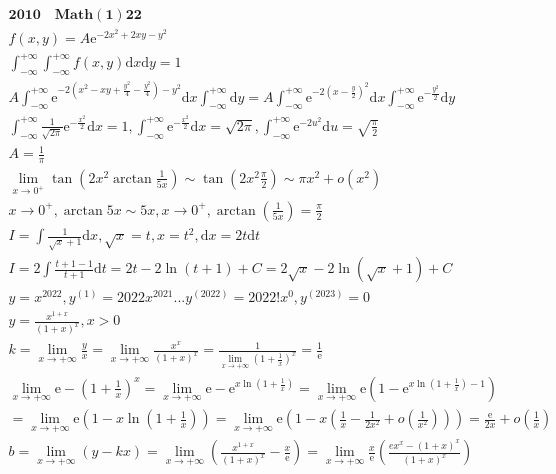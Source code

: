 \documentclass{article}
\begin{document}
\clearpage 
\begin{align*}
    \bm{2010 \quad Math(1)22 } \\
    f(x,y) = A \mathrm{e}^{-2x^2+2xy-y^2} \\
    \int_{-\infty}^{+\infty}\int_{-\infty}^{+\infty} f(x,y) \mathrm{d}x\mathrm{d}y = 1 \\ 
    A  \int_{-\infty}^{+\infty} \mathrm{e}^{-2(x^2-xy+\frac{y^2}{4}-\frac{y^2}{4})-y^2} \mathrm{d}x\int_{-\infty}^{+\infty}\mathrm{d}y=A\int_{-\infty}^{+\infty}\mathrm{e}^{-2(x-\frac{y}{2})^2}\mathrm{d}x\int_{-\infty}^{+\infty}\mathrm{e}^{-\frac{y^2}{2}}\mathrm{d}y \\
    \int_{-\infty}^{+\infty}\frac{1}{\sqrt{2\pi}}\mathrm{e}^{-\frac{x^2}{2}} \mathrm{d}x = 1 ,\int_{-\infty}^{+\infty}\mathrm{e}^{-\frac{x^2}{2}} \mathrm{d}x = \sqrt{2\pi},\int_{-\infty}^{+\infty}\mathrm{e}^{-2u^2} \mathrm{d}u = \sqrt{\frac{\pi}{2}} \\
    A = \frac{1}{\pi} \\
    \lim_{x \to 0^{+}}\tan \left(2x^2 \arctan\frac{1}{5x}\right) \sim \tan\left(2x^2 \frac{\pi}{2}\right) \sim \pi x^2 + o(x^2)\\
    x \to 0^{+} ,\arctan 5x \sim 5x, x \to 0^{+} , \arctan\left(\frac{1}{5x}\right) = \frac{\pi}{2} \\
    I = \int \frac{1}{\sqrt{x}+1}\mathrm{d}x , \sqrt{x} = t,x = t^2,\mathrm{d}x = 2t\mathrm{d}t\\
    I = 2\int \frac{t+1-1}{t+1} \mathrm{d}t = 2t-2\ln(t+1)+C = 2\sqrt{x}-2\ln(\sqrt{x}+1)+C \\
    y = x^{2022} , y^{(1)} = 2022x^{2021}...y^{(2022)} = 2022!x^{0}, y^{(2023)}=0\\
    y = \frac{x^{1+x}}{(1+x)^{x}} ,x > 0 \\
    k = \lim_{x \to +\infty} \frac{y}{x} = \lim_{x \to +\infty}\frac{x^{x}}{(1+x)^{x}} = \frac{1}{\lim_{x \to +\infty}\left(1+\frac{1}{x}\right)^{x}}  = \frac{1}{\mathrm{e}} \\
    \lim_{x \to +\infty} \mathrm{e} - \left(1+\frac{1}{x}\right)^{x} = \lim_{x \to +\infty} \mathrm{e} - \mathrm{e}^{x\ln\left(1+\frac{1}{x}\right)} = \lim_{x \to +\infty}\mathrm{e}\left(1-\mathrm{e}^{x\ln\left(1+\frac{1}{x}\right)-1}\right) \\
    = \lim_{x \to +\infty}\mathrm{e}\left(1-x\ln\left(1+\frac{1}{x}\right)\right) = \lim_{x \to +\infty} \mathrm{e}\left(1-x\left(\frac{1}{x}-\frac{1}{2x^2}+o(\frac{1}{x^2})\right)\right) = \frac{\mathrm{e}}{2x} + o(\frac{1}{x})\\
    b = \lim_{x \to +\infty} (y - kx) = \lim_{x \to +\infty}\left(\frac{x^{1+x}}{(1+x)^{x}}-\frac{x}{\mathrm{e}} \right) = \lim_{x \to +\infty} \frac{x}{\mathrm{e}}\left(\frac{ex^{x}-(1+x)^{x}}{(1+x)^{x}} \right) \\

\end{align*}
\end{document}
